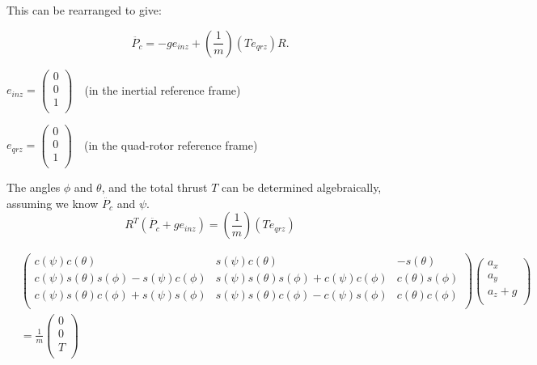 This can be rearranged to give:

\begin{equation}
    \label{eq:acc_from_model}
    \ddot{P_c} = - g e_{inz} + \left(\frac{1}{m}\right) \left(T e_{qrz}\right) R .
\end{equation}


$ e_{inz} = \left( \begin{array}{c}
0\\0\\1\\
\end{array}\right) \text{  }$ (in the inertial reference frame)

$ e_{qrz} = \left( \begin{array}{c}
0\\0\\1\\
\end{array}\right) \text{  }$  (in the quad-rotor reference frame)

The angles $\phi$ and $\theta$, and the total thrust $T$ can be determined algebraically, assuming we know $\ddot{P_c}$ and $\psi$.\\

\begin{equation}
    \label{eq:thrustTransformation}
    R^T \left( \ddot{P_c} + g e_{inz}\right) = \left(\frac{1}{m}\right) \left(T e_{qrz}\right)
\end{equation}


\begin{equation}
\begin{split}
    &\left( \begin{array}{ccc}
        c(\psi) c(\theta) & s(\psi) c(\theta) & -s(\theta)\\
        c(\psi) s(\theta) s(\phi) - s(\psi) c(\phi) & s(\psi) s(\theta) s(\phi) + c(\psi) c(\phi) & c(\theta) s(\phi)\\
        c(\psi) s(\theta) c(\phi) + s(\psi) s(\phi) & s(\psi) s(\theta) c(\phi) - c(\psi) s(\phi) & c(\theta) c(\phi)\\
    \end{array} \right)\left( \begin{array}{c} a_x\\a_y\\a_z+g\\\end{array} \right)\\
    &= \frac{1}{m} \left( \begin{array}{c} 0\\0\\T\\ \end{array} \right)
\end{split}
\end{equation}

